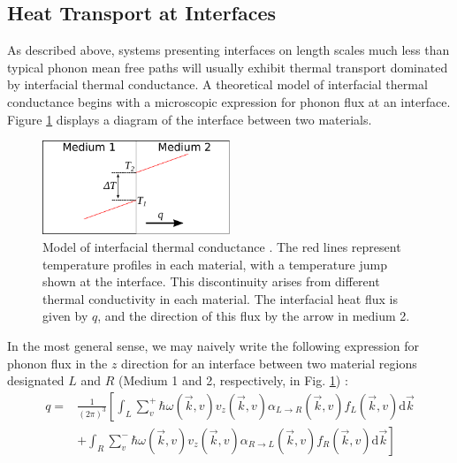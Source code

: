 \subsection{Heat Transport at Interfaces}
As described above, systems presenting interfaces on length scales much less than typical phonon mean free paths will usually exhibit thermal transport dominated by interfacial thermal conductance. A theoretical model of interfacial thermal conductance begins with a microscopic expression for phonon flux at an interface. Figure \ref{f:ch1nano1} displays a diagram of the interface between two materials.

\begin{figure}
\begin{center}
\includegraphics[width=0.5\textwidth]{./Chapter1/nanoscale1.pdf}
\caption[Diagram of thermal transport between interfaces.]{Model of interfacial thermal conductance \cite{PhysRevB.86.094303}. The red lines represent temperature profiles in each material, with a temperature jump shown at the interface. This discontinuity arises from different thermal conductivity in each material. The interfacial heat flux is given by $q$, and the direction of this flux by the arrow in medium 2.}
\label{f:ch1nano1}
\end{center}
\end{figure}

In the most general sense, we may naively write the following expression for phonon flux in the $z$ direction for an interface between two material regions designated $L$ and $R$ (Medium 1 and 2, respectively, in Fig. \ref{f:ch1nano1}) \cite{PhysRevB.80.165304}:
\begin{equation}\label{eq:nanoheat1}
\begin{split}
q =& \frac{1}{\left(2\pi\right)^3}\left[\int_L\sum_v^+ \hbar\omega(\vec{k},v)v_z(\vec{k}, v)\alpha_{L \rightarrow R}(\vec{k},v)f_L(\vec{k},v)\mathrm{d}\vec{k}\right. \\
&+ \left.\int_R\sum_v^- \hbar\omega(\vec{k},v)v_z(\vec{k}, v)\alpha_{R \rightarrow L}(\vec{k},v)f_R(\vec{k},v)\mathrm{d}\vec{k}\right]
\end{split}
\end{equation}

